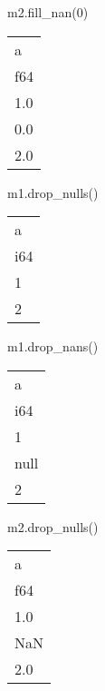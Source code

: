 \documentclass[
  letterpaper,
  DIV=11,
  numbers=noendperiod]{scrartcl}
\newenvironment{Shaded}{\begin{snugshade}}{\end{snugshade}}
\newcommand{\DecValTok}[1]{\textcolor[rgb]{0.68,0.00,0.00}{#1}}
\newcommand{\NormalTok}[1]{\textcolor[rgb]{0.00,0.23,0.31}{#1}}
\begin{document}
\begin{Shaded}
\begin{Highlighting}[]
\NormalTok{m2.fill\_nan(}\DecValTok{0}\NormalTok{)}
\end{Highlighting}
\end{Shaded}

\begin{longtable}[]{@{}l@{}}
\toprule()
a \\
f64 \\
\midrule()
\endhead
1.0 \\
0.0 \\
2.0 \\
\bottomrule()
\end{longtable}

\begin{Shaded}
\begin{Highlighting}[]
\NormalTok{m1.drop\_nulls()}
\end{Highlighting}
\end{Shaded}

\begin{longtable}[]{@{}l@{}}
\toprule()
a \\
i64 \\
\midrule()
\endhead
1 \\
2 \\
\bottomrule()
\end{longtable}

\begin{Shaded}
\begin{Highlighting}[]
\NormalTok{m1.drop\_nans()}
\end{Highlighting}
\end{Shaded}

\begin{longtable}[]{@{}l@{}}
\toprule()
a \\
i64 \\
\midrule()
\endhead
1 \\
null \\
2 \\
\bottomrule()
\end{longtable}

\begin{Shaded}
\begin{Highlighting}[]
\NormalTok{m2.drop\_nulls()}
\end{Highlighting}
\end{Shaded}

\begin{longtable}[]{@{}l@{}}
\toprule()
a \\
f64 \\
\midrule()
\endhead
1.0 \\
NaN \\
2.0 \\
\bottomrule()
\end{longtable}
\end{document}
